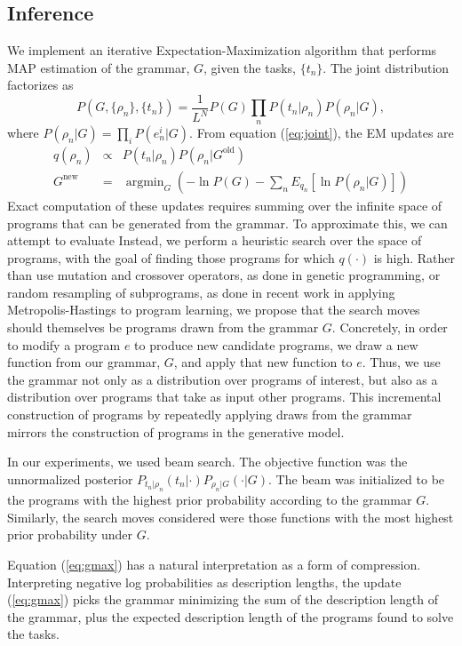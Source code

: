\documentclass{article} %
\begin{document}
\subsection{Inference}
We implement an iterative Expectation-Maximization algorithm that performs MAP estimation of the grammar, $G$, given the tasks, $\{t_n\}$.
The joint distribution factorizes as
\begin{equation}
P(G,\{\rho_n\},\{t_n\}) = \frac{1}{L^N} P(G) \prod_n P(t_n | \rho_n) P(\rho_n | G),
\label{eq:joint}
\end{equation}
where $P(\rho_n | G) = \prod_i P(e^i_n | G)$.
From equation (\ref{eq:joint}), the EM updates are
\begin{eqnarray}
q(\rho_n) &\propto& P(t_n | \rho_n) P(\rho_n | G^{\text{old}})\\
\label{eq:qdist}
G^{\text{new}} &=& \operatorname{argmin}_G \left( -\ln P(G) -
\sum_n 
E_{q_n}
 \left[ \ln P(\rho_n | G) \right] \right)
 \label{eq:gmax}
\end{eqnarray}
Exact computation of these updates requires summing over the infinite space of programs that can be generated from the grammar. To approximate this, we can attempt to evaluate 
Instead, we perform a heuristic search over the space of programs, with the goal of finding those programs for which $q(\cdot)$ is high.
Rather than use mutation and crossover operators, as done in genetic programming, or random resampling of subprograms, as done in recent work in applying Metropolis-Hastings to program learning, we propose that the search moves should themselves be programs drawn from the grammar $G$.
Concretely, in order to modify a program $e$ to produce new candidate programs, we draw a new function from our grammar, $G$, and apply that new function to $e$.
Thus, we use the grammar not only as a distribution over programs of interest, but also as a distribution over programs that take as input other programs.
This incremental construction of programs by repeatedly applying draws from the grammar mirrors the construction of programs in the generative model.

In our experiments, we used beam search. The objective function was the unnormalized posterior $P_{t_n|\rho_n}(t_n | \cdot )P_{\rho_n | G}(\cdot | G)$.
The beam was initialized to be the programs with the highest prior probability according to the grammar $G$.
Similarly, the search moves considered were those functions with the most highest prior probability under $G$.

Equation (\ref{eq:gmax}) has a natural interpretation as a form of compression.
Interpreting negative log probabilities as description lengths, the update (\ref{eq:gmax}) picks the grammar minimizing the sum of the description length of the grammar, plus the expected description length of the programs found to solve the tasks.
\end{document}
